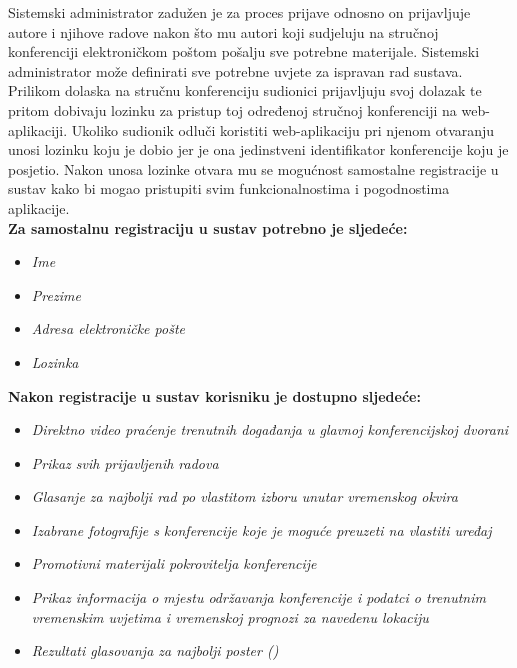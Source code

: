         Sistemski administrator zadužen je za proces prijave odnosno on prijavljuje autore i njihove radove nakon što mu autori koji sudjeluju na stručnoj konferenciji elektroničkom poštom pošalju sve potrebne materijale. Sistemski administrator može definirati sve potrebne uvjete za ispravan rad sustava.\\

        Prilikom dolaska na stručnu konferenciju sudionici prijavljuju svoj dolazak te pritom dobivaju lozinku za pristup toj određenoj stručnoj konferenciji na web-aplikaciji. Ukoliko sudionik odluči koristiti web-aplikaciju pri njenom otvaranju unosi lozinku koju je dobio jer je ona jedinstveni identifikator konferencije koju je posjetio. Nakon unosa lozinke otvara mu se mogućnost samostalne registracije u sustav kako bi mogao pristupiti svim funkcionalnostima i pogodnostima aplikacije.\\

        \textbf{Za samostalnu registraciju u sustav potrebno je sljedeće:}
        \begin{itemize}
            \item \textit{Ime}
            \item \textit{Prezime}
            \item \textit{Adresa elektroničke pošte}
            \item \textit{Lozinka}
        \end{itemize}

        \textbf{Nakon registracije u sustav korisniku je dostupno sljedeće:}
        \begin{itemize}
            \item \textit{Direktno video praćenje trenutnih događanja u glavnoj konferencijskoj dvorani}
            \item \textit{Prikaz svih prijavljenih radova}
            \item \textit{Glasanje za najbolji rad po vlastitom izboru unutar vremenskog okvira}
            \item \textit{Izabrane fotografije s konferencije koje je moguće preuzeti na vlastiti uređaj}
            \item \textit{Promotivni materijali pokrovitelja konferencije}
            \item \textit{Prikaz informacija o mjestu održavanja konferencije i podatci o trenutnim vremenskim uvjetima i vremenskoj prognozi za navedenu lokaciju}
            \item \textit{Rezultati glasovanja za najbolji poster ()}
        \end{itemize}
		
